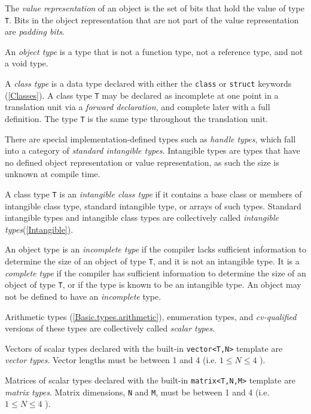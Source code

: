 \p The \textit{value representation} of an object is the set of bits that hold
the value of type \texttt{T}. Bits in the object representation that are not
part of the value representation are \textit{padding bits}.

\p An \textit{object type} is a type that is not a function type, not a
reference type, and not a void type.

\p A \textit{class type} is a data type declared with either the \texttt{class}
or \texttt{struct} keywords (\ref{Classes}). A class type \texttt{T} may be
declared as incomplete at one point in a translation unit via a \textit{forward
declaration}, and complete later with a full definition. The type \texttt{T} is
the same type throughout the translation unit.

\p There are special implementation-defined types such as \textit{handle types},
which fall into a category of \textit{standard intangible types}. Intangible
types are types that have no defined object representation or value
representation, as such the size is unknown at compile time.

\p A class type \texttt{T} is an \textit{intangible class type} if it contains
a base class or members of intangible class type, standard intangible type,
or arrays of such types. Standard intangible types and intangible class types
are collectively called \textit{intangible types}(\ref{Intangible}).

\p An object type is an \textit{incomplete type} if the compiler lacks
sufficient information to determine the size of an object of type \texttt{T},
and it is not an intangible type. It is a \textit{complete type} if the compiler
has sufficient information to determine the size of an object of type
\texttt{T}, or if the type is known to be an intangible type. An object may not
be defined to have an \textit{incomplete} type.

\p Arithmetic types (\ref{Basic.types.arithmetic}), enumeration types, and
\textit{cv-qualified} versions of these types are collectively called
\textit{scalar types}.

\p Vectors of scalar types declared with the built-in \texttt{vector<T,N>}
template are \textit{vector types}. Vector lengths must be between 1 and 4 (i.e.
\( 1 \leq N \leq 4 \) ).

\p Matrices of scalar types declared with the built-in \texttt{matrix<T,N,M>}
template are \textit{matrix types}. Matrix dimensions, \texttt{N} and
\texttt{M}, must be between 1 and 4 (i.e. \( 1 \leq N \leq 4 \) ).

